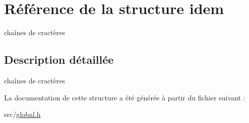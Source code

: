 \hypertarget{structidem}{}\section{Référence de la structure idem}
\label{structidem}


chaînes de cractères  




\subsection{Description détaillée}
chaînes de cractères 

La documentation de cette structure a été générée à partir du fichier suivant \+:\begin{DoxyCompactItemize}
\item 
src/\mbox{\hyperlink{global_8h}{global.\+h}}\end{DoxyCompactItemize}
